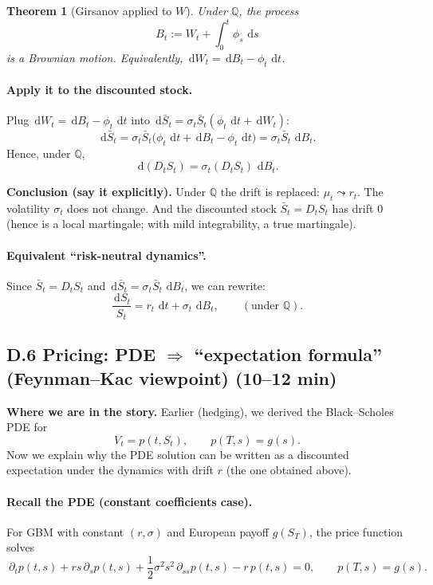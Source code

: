 \documentclass[11pt]{article}
\newcommand{\Qbb}{\mathbb{Q}}
\newcommand{\dd}{\,\mathrm{d}}
\newcommand{\1}{\mathbf{1}}
\newtheorem{theorem}{Theorem}
\begin{document}
\begin{theorem}[Girsanov applied to $W$]
Under $\Qbb$, the process
\[
B_t := W_t+\int_0^t \phi_s\,\dd s
\]
is a Brownian motion.
Equivalently, $\dd W_t = \dd B_t - \phi_t\,\dd t$.
\end{theorem}

\paragraph{Apply it to the discounted stock.}
Plug $\dd W_t = \dd B_t - \phi_t\,\dd t$ into
$\dd\bar S_t = \sigma_t \bar S_t(\phi_t\,\dd t + \dd W_t)$:
\[
\dd\bar S_t
=
\sigma_t \bar S_t\big(\phi_t\,\dd t + \dd B_t - \phi_t\,\dd t\big)
=
\sigma_t \bar S_t\,\dd B_t.
\]
Hence, under $\Qbb$,
\[
\boxed{\ \dd(D_t S_t)=\sigma_t (D_t S_t)\,\dd B_t. \ }
\]


\textbf{Conclusion (say it explicitly).}
Under $\Qbb$ the drift is replaced: $\mu_t \leadsto r_t$.
The volatility $\sigma_t$ does not change.
And the discounted stock $\bar S_t=D_tS_t$ has drift $0$
(hence is a local martingale; with mild integrability, a true martingale).


\paragraph{Equivalent ``risk-neutral dynamics''.}
Since $\bar S_t=D_tS_t$ and $\dd\bar S_t=\sigma_t \bar S_t\,\dd B_t$, we can rewrite:
\[
\frac{\dd S_t}{S_t}
=
r_t\,\dd t+\sigma_t\,\dd B_t,
\qquad (\text{under }\Qbb).
\]

\subsection*{D.6 Pricing: PDE $\Rightarrow$ ``expectation formula'' (Feynman--Kac viewpoint) (10--12 min)}


\textbf{Where we are in the story.}
Earlier (hedging), we derived the Black--Scholes PDE for
\[
V_t=p(t,S_t),\qquad p(T,s)=g(s).
\]
Now we explain why the PDE solution can be written as a discounted expectation
under the dynamics with drift $r$ (the one obtained above).


\paragraph{Recall the PDE (constant coefficients case).}
For GBM with constant $(r,\sigma)$ and European payoff $g(S_T)$, the price function solves
\[
\boxed{
\ \partial_t p(t,s) + r s\,\partial_s p(t,s)
+ \frac12\sigma^2 s^2\,\partial_{ss}p(t,s) - r\,p(t,s) = 0,
\qquad p(T,s)=g(s).\ }
\]
\end{document}

